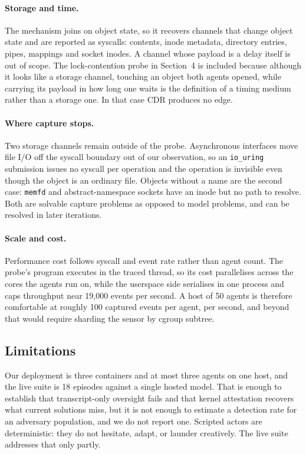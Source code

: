 \documentclass[11pt]{article}
\begin{document}
\paragraph{Storage and time.} The mechanism joins on object state, so it recovers
channels that change object state and are reported as syscalls: contents, inode
metadata, directory entries, pipes, mappings and socket inodes. A channel whose payload
is a delay itself is out of scope. The lock-contention probe in Section~4 is included
because although it looks like a storage channel, touching an object both agents opened,
while carrying its payload in how long one waits is the definition of a timing medium
rather than a storage one. In that case CDR produces no edge.

\paragraph{Where capture stops.} Two storage channels remain outside of the probe.
Asynchronous interfaces move file I/O off the syscall boundary out of our observation,
so an \texttt{io\_uring} submission issues no syscall per operation and the operation is
invisible even though the object is an ordinary file. Objects without a name are the
second case: \texttt{memfd} and abstract-namespace sockets have an inode but no path to
resolve. Both are solvable capture problems as opposed to model problems, and can be
resolved in later iterations.

\paragraph{Scale and cost.} Performance cost follows syscall and event rate rather than
agent count. The probe's program executes in the traced thread, so its cost parallelises
across the cores the agents run on, while the userspace side serialises in one process
and caps throughput near 19,000 events per second. A host of 50 agents is therefore
comfortable at roughly 100 captured events per agent, per second, and beyond that would
require sharding the sensor by cgroup subtree.

\subsection*{Limitations}

Our deployment is three containers and at most three agents on one host, and the live
suite is 18 episodes against a single hosted model. That is enough to establish
that transcript-only oversight fails and that kernel attestation recovers what current
solutions miss, but it is not enough to estimate a detection rate for an adversary
population, and we do not report one. Scripted actors are deterministic: they do not
hesitate, adapt, or launder creatively. The live suite addresses that only partly.
\end{document}
